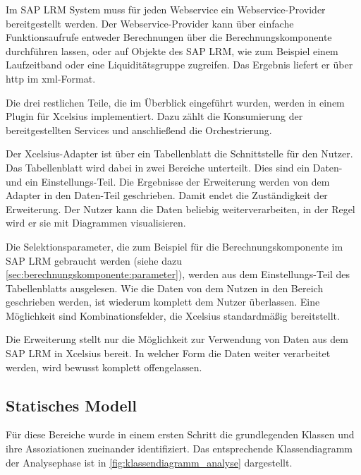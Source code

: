 \begin{onehalfspacing}
Im SAP LRM System muss für jeden Webservice ein Webservice-Provider bereitgestellt werden. Der Webservice-Provider kann über einfache Funktionsaufrufe entweder Berechnungen über die Berechnungskomponente durchführen lassen, oder auf Objekte des SAP LRM, wie zum Beispiel einem Laufzeitband oder eine Liquiditätsgruppe zugreifen. Das Ergebnis liefert er über \gls{http} im \gls{xml}-Format.

Die drei restlichen Teile, die im Überblick eingeführt wurden, werden in einem Plugin für \gls{Xcelsius} implementiert. Dazu zählt die Konsumierung der bereitgestellten Services und anschließend die Orchestrierung.

Der \gls{Xcelsius}-Adapter ist über ein Tabellenblatt die Schnittstelle für den Nutzer. Das Tabellenblatt wird dabei in zwei Bereiche unterteilt. Dies sind ein Daten- und ein Ein\-stel\-lungs-Teil. Die Ergebnisse der Erweiterung werden von dem Adapter in den Daten-Teil geschrieben. Damit endet die Zuständigkeit der Erweiterung. Der Nutzer kann die Daten beliebig weiterverarbeiten, in der Regel wird er sie mit Diagrammen visualisieren.

Die Selektionsparameter, die zum Beispiel für die Berechnungskomponente im SAP LRM gebraucht werden (siehe dazu \vref{sec:berechnungskomponente:parameter}), werden aus dem Ein\-stel\-lungs-Teil des Tabellenblatts ausgelesen. Wie die Daten von dem Nutzen in den Bereich geschrieben werden, ist wiederum komplett dem Nutzer überlassen. Eine Möglichkeit sind Kombinationsfelder, die \gls{Xcelsius} standardmäßig bereitstellt.

Die Erweiterung stellt nur die Möglichkeit zur Verwendung von Daten aus dem SAP LRM in \gls{Xcelsius} bereit. In welcher Form die Daten weiter verarbeitet werden, wird bewusst komplett offengelassen.

\subsection{Statisches Modell}
Für diese Bereiche wurde in einem ersten Schritt die grundlegenden Klassen und ihre Assoziationen zueinander identifiziert. Das entsprechende Klassendiagramm der Analysephase ist in \vref{fig:klassendiagramm_analyse} dargestellt.


\end{onehalfspacing}
